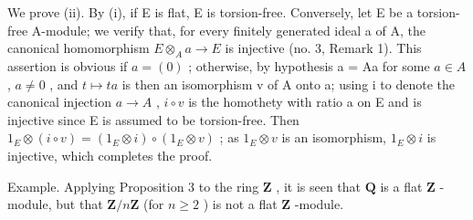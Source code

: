 We prove (ii). By (i), if E is flat, E is torsion-free. Conversely, let E be a torsion-free A-module; we verify that, for every finitely generated ideal a of A, the canonical homomorphism \(E \otimes_{A} a \to E\) is injective (no. 3, Remark 1). This assertion is obvious if \(a = (0)\) ; otherwise, by hypothesis a = Aa for some \(a \in A\) , \(a \neq 0\) , and \(t \mapsto ta\) is then an isomorphism v of A onto a; using i to denote the canonical injection \(a \to A\) , \(i \circ v\) is the homothety with ratio a on E and is injective since E is assumed to be torsion-free. Then \(1_{E} \otimes (i \circ v) = (1_{E} \otimes i) \circ (1_{E} \otimes v)\) ; as \(1_{E} \otimes v\) is an isomorphism, \(1_{E} \otimes i\) is injective, which completes the proof.

Example. Applying Proposition 3 to the ring \(\mathbf{Z}\) , it is seen that \(\mathbf{Q}\) is a flat \(\mathbf{Z}\) -module, but that \(\mathbf{Z}/n\mathbf{Z}\) (for \(n \geqslant 2\) ) is not a flat \(\mathbf{Z}\) -module.

